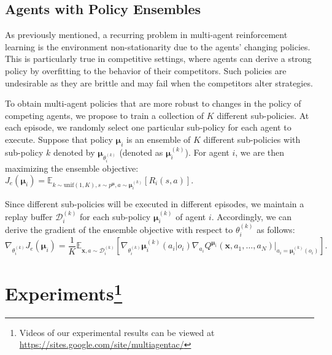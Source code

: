 \documentclass{article}
\newcommand{\cpol}[0]{\pmb{\mu}}
\begin{document}
\subsection{Agents with Policy Ensembles}
\label{sec:ensemble}
As previously mentioned, a recurring problem in multi-agent reinforcement learning is the environment non-stationarity due to the agents' changing policies. This is particularly true in competitive settings, where agents can derive a strong policy by overfitting to the behavior of their competitors. Such policies are undesirable as they are brittle and may fail when the competitors alter strategies.



To obtain multi-agent policies that are more robust to changes in the policy of competing agents, we propose to train a collection of $K$ different sub-policies. At each episode, we randomly select one particular sub-policy for each agent to execute. 
Suppose that policy $\cpol_i$ is an ensemble of $K$ different sub-policies with sub-policy $k$ denoted by $\cpol_{\theta_i^{(k)}}$ (denoted as $\cpol_i^{(k)}$). For agent $i$, we are then maximizing the ensemble objective:
$
J_e(\cpol_i)=\mathbb{E}_{k\sim\textrm{unif}(1,K),s\sim p^{\cpol},a\sim\cpol_i^{(k)}}\left[R_i(s,a)\right].
$


Since different sub-policies will be executed in different episodes, we maintain a replay buffer $\mathcal{D}_i^{(k)}$ for each sub-policy $\cpol_i^{(k)}$ of agent $i$. Accordingly, we can derive the gradient of the ensemble objective with respect to $\theta_i^{(k)}$ as follows:
\begin{equation}\label{eq:J_ensemble_grad}
\nabla_{\theta_i^{(k)}} J_e(\cpol_i)=\frac{1}{K}\mathbb{E}_{\mathbf{x},a\sim \mathcal{D}_i^{(k)}}\left[\nabla_{\theta_i^{(k)}} \cpol_i^{(k)}(a_i|o_i)\nabla_{a_i}Q^{\cpol_i}\left(\mathbf{x},a_1,\ldots,a_N\right)\Big|_{a_i=\cpol_i^{(k)}(o_i)}\right].
\end{equation}

\section{Experiments\protect\footnote[1]{
Videos of our experimental results can be viewed at \href{https://sites.google.com/site/multiagentac/}{https://sites.google.com/site/multiagentac/}}}
\label{sec:experiments}
\end{document}
